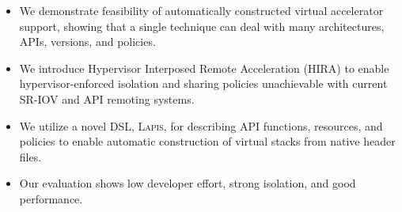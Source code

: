 \begin{itemize}[nosep,leftmargin=1em,labelwidth=*,align=left]
\item We demonstrate feasibility of automatically constructed virtual accelerator support, showing that a single technique can deal with many architectures, APIs, versions, and policies.
\item We introduce {{H}ypervisor {I}nterposed {R}emote {A}cceleration} (HIRA) to enable hypervisor-enforced isolation and sharing policies unachievable with current SR-IOV and API remoting systems.
\item We utilize a novel DSL, \textsc{Lapis}, for describing API functions, resources, and policies to enable automatic construction of virtual stacks from native header files.
\item Our evaluation shows low developer effort, strong isolation, and good performance.
\end{itemize}
